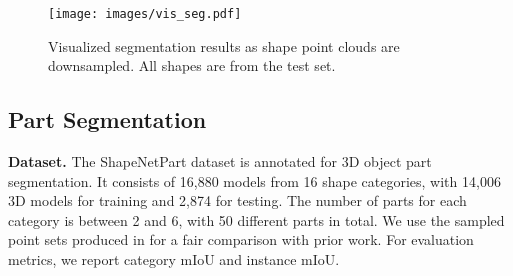 \documentclass[10pt,twocolumn,letterpaper]{article}
\begin{document}
\begin{table}[t]
\centering
{}
\caption{Classification results on ModelNet40. In comparison with other SOTA methods that also only use raw point clouds as input. Note that our reported results did not consider the voting strategy.}
\label{table:cls}
\end{table}

\begin{figure*}[t]
    \centering
    \texttt{[image: images/vis\_seg.pdf]}
    \caption{Visualized segmentation results as shape point clouds are downsampled. All shapes are from the test set.}
    \label{fig:vis_seg}
\end{figure*}


\subsection{Part Segmentation}
\label{sec:seg}
\textbf{Dataset.}
The ShapeNetPart dataset \cite{Yi2016ASA} is annotated for 3D object part segmentation. It consists of 16,880 models from 16 shape categories, with 14,006 3D models for training and 2,874 for testing. The number of parts for each category is between 2 and 6, with 50 different parts in total. We use the sampled point sets produced in \cite{Qi2017PointNetDH} for a fair comparison with prior work. For evaluation metrics, we report category mIoU and instance mIoU.
\end{document}
